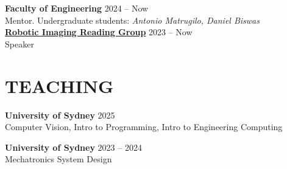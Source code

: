 \documentclass[11pt,a4paper]{article}
\begin{document}
\textbf{Faculty of Engineering} \hfill 2024 -- Now\\
Mentor. Undergraduate students: \textit{Antonio Matrugilo, Daniel Biswas}\\

\textbf{\href{https://roboticimaging.github.io/ImgRG/}{Robotic Imaging Reading Group}} \hfill 2023 -- Now\\
Speaker

\section*{TEACHING}

\textbf{University of Sydney} \hfill 2025 \\
Computer Vision, Intro to Programming, Intro to Engineering Computing

\vspace{0.3em}

\textbf{University of Sydney} \hfill 2023 -- 2024 \\
Mechatronics System Design
\end{document}
